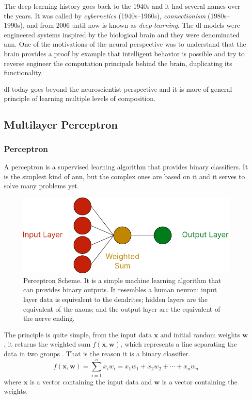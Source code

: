 The deep learning history goes back to the 1940s and it had several names over the years. It was called by \emph{cybernetics} (1940s--1960s), \emph{connectionism} (1980s--1990s), and from 2006 until now is known as \emph{deep learning}.
The \gls*{dl} models were engineered systems inspired by the biological brain and they were denominated \gls*{ann}.
One of the motivations of the neural perspective was to understand that the brain provides a proof by example that intelligent behavior is possible and try to reverse engineer the computation principals behind the brain, duplicating its functionality.

\gls*{dl} today goes beyond the neuroscientist perspective and it is more of general principle of learning multiple levels of composition.

\subsection{Multilayer Perceptron}

\subsubsection*{Perceptron}

A perceptron is a supervised learning algorithm that provides binary classifiers. It is the simplest kind of \gls*{ann}, but the complex ones are based on it and it serves to solve many problems yet.

\begin{figure}[H]
    \centering
    \includegraphics{figures/2methodology/nn/perceptron.pdf}
    \caption[Perceptron Scheme]{Perceptron Scheme. It is a simple machine learning algorithm that can provides binary outputs. It resembles a human neuron: input layer data is equivalent to the dendrites; hidden layers are the equivalent of the axons; and the output layer are the equivalent of the nerve ending.}
\end{figure}

The principle is quite simple, from the input data \(\mathbf{x}\) and initial random weights \(\mathbf{w}\), it returns the weighted sum \(f(\mathbf{x},\mathbf{w})\), which represents a line separating the data in two groups \citep{raschka2015}. That is the reason it is a binary classifier.
%
\begin{equation}\label{eq:perceptron_weighted_sum}
    f(\mathbf{x},\mathbf{w}) = \sum_{i=1}^n x_iw_i =  x_1w_1 + x_2w_2 + \cdots + x_nw_n
\end{equation}
%
where \(\mathbf{x}\) is a vector containing the input data and \(\mathbf{w}\) is a vector containing the weights.

